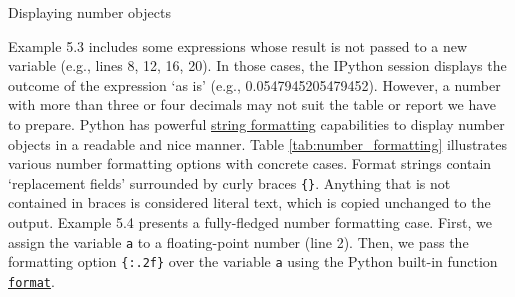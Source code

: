 \documentclass[a4paper,11pt]{book}
\newcommand{\question}[1]{%
    \begin{tcolorbox}[colback=comp_c!10,colframe=comp_c,sidebyside align=top,width=\linewidth,before skip=1ex]
        #1
    \end{tcolorbox}%
    \switchcolumn%
}
\newcommand{\note}[1]{%
    \begin{tcolorbox}[colback=white!0,colframe=white!10,width=\linewidth,before skip=1ex]
        #1
    \end{tcolorbox}         
}
\begin{document}
\begin{paracol}{2}
	\question{\raggedright Displaying number objects}
	\note{Example 5.3 includes some expressions whose result is not passed to a new variable (e.g., lines 8, 12, 16, 20). In those cases, the IPython session displays the outcome of the expression `as is' (e.g., 0.0547945205479452). However, a number with more than three or four decimals may not suit the table or report we have to prepare. Python has powerful \href{https://docs.python.org/3/library/string.html}{string formatting} capabilities to display number objects in a readable and nice manner. Table \ref{tab:number_formatting} illustrates various number formatting options with concrete cases. Format strings contain `replacement fields' surrounded by curly braces \texttt{\{\}}. Anything that is not contained in braces is considered literal text, which is copied unchanged to the output. Example 5.4 presents a fully-fledged number formatting case. First, we assign the variable \texttt{a} to a floating-point number (line 2). Then, we pass the formatting option \texttt{\{:.2f\}} over the variable \texttt{a} using the Python built-in function \href{https://docs.python.org/3/library/stdtypes.html#str.format}{\texttt{format}}.}
\end{paracol}
\clearpage
\end{document}
